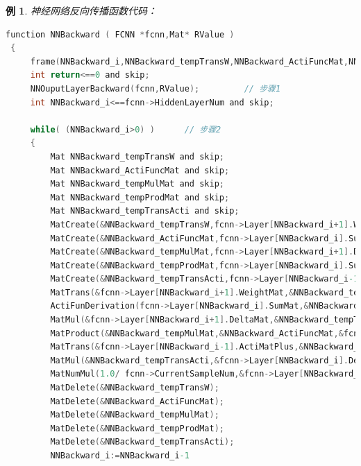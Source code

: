 \documentclass[UTF-8]{progbookcn}
\newtheorem{example}{例}[chapter]         %
\begin{document}
\begin{example}
神经网络反向传播函数代码：
\begin{lstlisting}[language=C,caption={函数 4 NNBackward}]
function NNBackward ( FCNN *fcnn,Mat* RValue )
 {
     frame(NNBackward_i,NNBackward_tempTransW,NNBackward_ActiFuncMat,NNBackward_tempMulMat,NNBackward_tempProdMat,NNBackward_tempTransActi,return) and (
     int return<==0 and skip;
     NNOuputLayerBackward(fcnn,RValue);         // 步骤1
     int NNBackward_i<==fcnn->HiddenLayerNum and skip;

     while( (NNBackward_i>0) )      // 步骤2
     {
         Mat NNBackward_tempTransW and skip;
         Mat NNBackward_ActiFuncMat and skip;
         Mat NNBackward_tempMulMat and skip;
         Mat NNBackward_tempProdMat and skip;
         Mat NNBackward_tempTransActi and skip;
         MatCreate(&NNBackward_tempTransW,fcnn->Layer[NNBackward_i+1].WeightMat.col,fcnn->Layer[NNBackward_i+1].WeightMat.row,RValue);
         MatCreate(&NNBackward_ActiFuncMat,fcnn->Layer[NNBackward_i].SumMat.row,fcnn->Layer[NNBackward_i].SumMat.col,RValue);
         MatCreate(&NNBackward_tempMulMat,fcnn->Layer[NNBackward_i+1].DeltaMat.row,fcnn->Layer[NNBackward_i+1].WeightMat.row,RValue);
         MatCreate(&NNBackward_tempProdMat,fcnn->Layer[NNBackward_i].SumMat.row,fcnn->Layer[NNBackward_i].SumMat.col,RValue);
         MatCreate(&NNBackward_tempTransActi,fcnn->Layer[NNBackward_i-1].ActiMatPlus.col,fcnn->Layer[NNBackward_i-1].ActiMatPlus.row,RValue);
         MatTrans(&fcnn->Layer[NNBackward_i+1].WeightMat,&NNBackward_tempTransW,RValue);
         ActiFunDerivation(fcnn->Layer[NNBackward_i].SumMat,&NNBackward_ActiFuncMat,fcnn->Layer[NNBackward_i].AcitFuncNum,RValue);
         MatMul(&fcnn->Layer[NNBackward_i+1].DeltaMat,&NNBackward_tempTransW,&NNBackward_tempMulMat,RValue);
         MatProduct(&NNBackward_tempMulMat,&NNBackward_ActiFuncMat,&fcnn->Layer[NNBackward_i].DeltaMat,RValue);
         MatTrans(&fcnn->Layer[NNBackward_i-1].ActiMatPlus,&NNBackward_tempTransActi,RValue);
         MatMul(&NNBackward_tempTransActi,&fcnn->Layer[NNBackward_i].DeltaMat,&fcnn->Layer[NNBackward_i].NablaWbMat,RValue);
         MatNumMul(1.0/ fcnn->CurrentSampleNum,&fcnn->Layer[NNBackward_i].NablaWbMat,&fcnn->Layer[NNBackward_i].NablaWbMat,RValue);
         MatDelete(&NNBackward_tempTransW);
         MatDelete(&NNBackward_ActiFuncMat);
         MatDelete(&NNBackward_tempMulMat);
         MatDelete(&NNBackward_tempProdMat);
         MatDelete(&NNBackward_tempTransActi);
         NNBackward_i:=NNBackward_i-1


\end{lstlisting}
\end{example}
\end{document}
